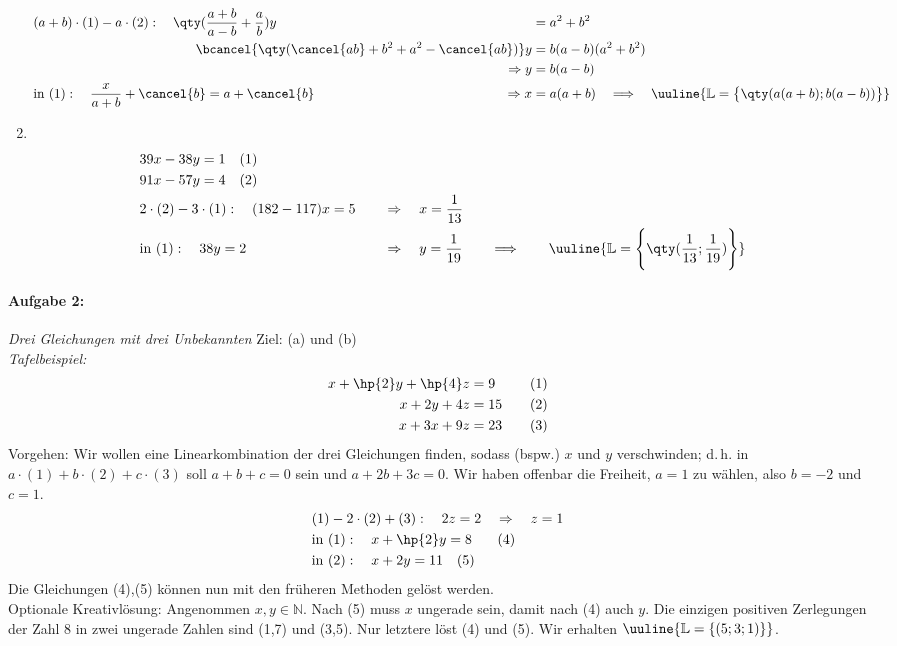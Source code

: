 \begin{enumerate}[label=(\alph*)]
\begin{alignat*}{3}
        &(a+b) \cdot (1) - a\cdot(2): \quad \qty(\frac{a+b}{a-b}+\frac{a}{b}) y &&= a^2 +b^2 \\
        && \hspace{-3.5cm}\bcancel{\qty(\cancel{ab}+b^2 + a^2 - \cancel{ab})}y &= b(a-b)(a^2 +b^2) \\
        && \hspace{-1cm}\Rightarrow y &= b(a-b) \\
        &\text{in }(1): \quad \frac{x}{a+b} +\cancel{b} = a+ \cancel{b} & \hspace{-1cm}\Rightarrow x &= a(a+b) \quad \Longrightarrow \quad \uuline{\mathbb{L} = \big\{\qty(a(a+b);b(a-b))\big\}}
    \end{alignat*}
    \item $~$\\[-1.45cm] 
    \begin{alignat*}{3}
        &39x-38y=1 \quad (1) \\
        &91x-57y=4 \quad (2) \\
        &2\cdot(2)-3\cdot(1): \quad (182-117)x = 5 \quad &&\Rightarrow \quad x = \frac{1}{13} \\
        &\text{in } (1): \quad 38y = 2 &&  \Rightarrow \quad y = \frac{1}{19} \qquad \Longrightarrow \qquad \uuline{\mathbb{L} = \Bigg\{\qty(\frac{1}{13};\frac{1}{19})\Bigg\}}
    \end{alignat*}
\end{enumerate}

\newpage
\paragraph{Aufgabe 2: } \emph{Drei Gleichungen mit drei Unbekannten} \hfill Ziel: (a) und (b)\\[0.2cm]
%
\emph{Tafelbeispiel: }
\begin{alignat*}{2}
    x+ \hp{2}y + \hp{4}z &= 9 &&\quad (1) \\
    x+2y+4z&=15 &&\quad (2) \\
    x+3x+9z&=23 &&\quad (3)
\end{alignat*}
Vorgehen: Wir wollen eine Linearkombination der drei Gleichungen finden, sodass (bspw.) $x$ und $y$ verschwinden; d.\,h. in $a\cdot(1)+b\cdot(2)+c\cdot(3)$ soll $a+b+c =0$ sein und $a+2b+3c=0$. Wir haben offenbar die Freiheit, $a=1$ zu wählen, also $b=-2$ und $c=1$.
\begin{align*}
    &(1)-2\cdot(2)+(3): \quad 2z=2 \quad \Rightarrow \quad z=1 \\
    &\text{in }(1): \quad x+\hp{2}y = 8\;\;\; \quad(4)\\
    &\text{in }(2): \quad x+2y = 11 \quad (5)
\end{align*}
Die Gleichungen (4),(5) können nun mit den früheren Methoden gelöst werden. \\
Optionale Kreativlösung: Angenommen $x,y \in \mathbb{N}$. Nach (5) muss $x$ ungerade sein, damit nach (4) auch $y$. Die einzigen positiven Zerlegungen der Zahl 8 in zwei ungerade Zahlen sind (1,7) und (3,5). Nur letztere löst (4) und (5). Wir erhalten $\uuline{\mathbb{L} = \{(5;3;1)\}}$.

